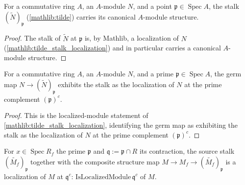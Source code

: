 \begin{lemma}
  \label{found:instModuleStalkOfTilde}
  For a commutative ring \(A\), an \(A\)-module \(N\), and a point
  \(\mathfrak p\in\operatorname{Spec}A\), the stalk \((\widetilde N)_{\mathfrak p}\)
  (\cref{mathlib:tilde}) carries its canonical \(A\)-module structure.
\end{lemma}

\begin{proof}
  \leanok
  The stalk of \(\widetilde N\) at \(\mathfrak p\) is, by Mathlib, a localization of \(N\)
  (\cref{mathlib:tilde_stalk_localization}) and in particular carries a canonical
  \(A\)-module structure.
\end{proof}

\begin{lemma}
  \label{found:instIsLocalizedModuleStalkOfTilde}
  For a commutative ring \(A\), an \(A\)-module \(N\), and a prime
  \(\mathfrak p\in\operatorname{Spec}A\), the germ map \(N\to(\widetilde N)_{\mathfrak p}\)
  exhibits the stalk as the localization of \(N\) at the prime complement
  \((\mathfrak p)^{c}\).
\end{lemma}

\begin{proof}
  \leanok
  This is the localized-module statement of \cref{mathlib:tilde_stalk_localization},
  identifying the germ map as exhibiting the stalk as the localization of \(N\) at the
  prime complement \((\mathfrak p)^{c}\).
\end{proof}


\begin{lemma}
  \label{lem:tilde_pullback_stalk_source_isLocalizedModule}
  For \(x\in\operatorname{Spec}R_f\) the prime \(\mathfrak p\) and \(\mathfrak q:=
  \mathfrak p\cap R\) its contraction, the source stalk \((\widetilde{M_f})_{\mathfrak p}\)
  together with the composite structure map \(M\to M_f\to(\widetilde{M_f})_{\mathfrak p}\)
  is a localization of \(M\) at \(\mathfrak q^{c}\):
  \(\mathrm{IsLocalizedModule}\,\mathfrak q^{c}\) of \(M\).
\end{lemma}


